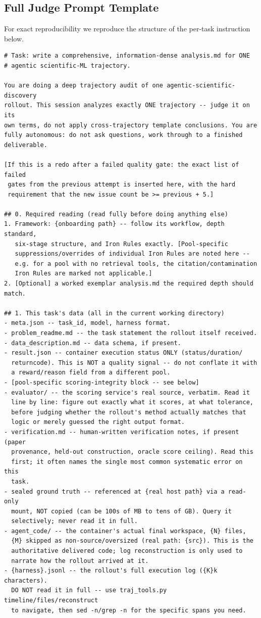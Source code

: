 \subsection{Full Judge Prompt Template}
\label{app:evaluator:fulltemplate}

For exact reproducibility we reproduce the structure of the
per-task instruction below.

\begin{lstlisting}[style=prompt]
# Task: write a comprehensive, information-dense analysis.md for ONE
# agentic scientific-ML trajectory.

You are doing a deep trajectory audit of one agentic-scientific-discovery
rollout. This session analyzes exactly ONE trajectory -- judge it on its
own terms, do not apply cross-trajectory template conclusions. You are
fully autonomous: do not ask questions, work through to a finished
deliverable.

[If this is a redo after a failed quality gate: the exact list of failed
 gates from the previous attempt is inserted here, with the hard
 requirement that the new issue count be >= previous + 5.]

## 0. Required reading (read fully before doing anything else)
1. Framework: {onboarding path} -- follow its workflow, depth standard,
   six-stage structure, and Iron Rules exactly. [Pool-specific
   suppressions/overrides of individual Iron Rules are noted here --
   e.g. for a pool with no retrieval tools, the citation/contamination
   Iron Rules are marked not applicable.]
2. [Optional] a worked exemplar analysis.md the required depth should match.

## 1. This task's data (all in the current working directory)
- meta.json -- task_id, model, harness format.
- problem_readme.md -- the task statement the rollout itself received.
- data_description.md -- data schema, if present.
- result.json -- container execution status ONLY (status/duration/
  returncode). This is NOT a quality signal -- do not conflate it with
  a reward/reason field from a different pool.
- [pool-specific scoring-integrity block -- see below]
- evaluator/ -- the scoring service's real source, verbatim. Read it
  line by line: figure out exactly what it scores, at what tolerance,
  before judging whether the rollout's method actually matches that
  logic or merely guessed the right output format.
- verification.md -- human-written verification notes, if present (paper
  provenance, held-out construction, oracle score ceiling). Read this
  first; it often names the single most common systematic error on this
  task.
- sealed ground truth -- referenced at {real host path} via a read-only
  mount, NOT copied (can be 100s of MB to tens of GB). Query it
  selectively; never read it in full.
- agent_code/ -- the container's actual final workspace, {N} files,
  {M} skipped as non-source/oversized (real path: {src}). This is the
  authoritative delivered code; log reconstruction is only used to
  narrate how the rollout arrived at it.
- {harness}.jsonl -- the rollout's full execution log ({K}k characters).
  DO NOT read it in full -- use traj_tools.py timeline/files/reconstruct
  to navigate, then sed -n/grep -n for the specific spans you need.


\end{lstlisting}
